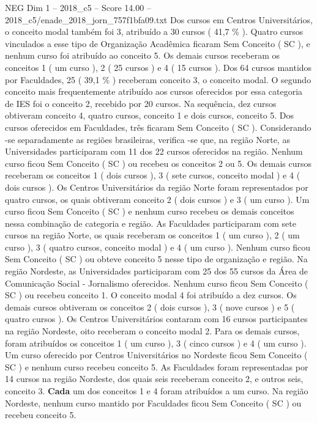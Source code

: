 \begin{textsample}{NEG Dim 1 – 2018\_c5 – Score 14.00 – 2018\_c5/enade\_2018\_jorn\_757f1bfa09.txt}
Dos cursos em Centros Universitários, o conceito modal também foi 3, atribuído a 30 cursos ( 41,7 \% ).
Quatro cursos vinculados a esse tipo de Organização Acadêmica ficaram Sem Conceito ( SC ), e nenhum curso foi atribuído ao conceito 5.
Os demais cursos receberam os conceitos 1 ( um curso ), 2 ( 25 cursos ) e 4 ( 15 cursos ).
Dos 64 cursos mantidos por Faculdades, 25 ( 39,1 \% ) receberam conceito 3, o conceito modal.
O segundo conceito mais frequentemente atribuído aos cursos oferecidos por essa categoria de IES foi o conceito 2, recebido por 20 cursos.
Na sequência, dez cursos obtiveram conceito 4, quatro cursos, conceito 1 e dois cursos, conceito 5.
Dos cursos oferecidos em Faculdades, três ficaram Sem Conceito ( SC ).
Considerando -se separadamente as regiões brasileiras, verifica -se que, na região Norte, as Universidades participaram com 11 dos 22 cursos oferecidos na região.
Nenhum curso ficou Sem Conceito ( SC ) ou recebeu os conceitos 2 ou 5.
Os demais cursos receberam os conceitos 1 ( dois cursos ), 3 ( sete cursos, conceito modal ) e 4 ( dois cursos ).
Os Centros Universitários da região Norte foram representados por quatro cursos, os quais obtiveram conceito 2 ( dois cursos ) e 3 ( um curso ).
Um curso ficou Sem Conceito ( SC ) e nenhum curso recebeu os demais conceitos nessa combinação de categoria e região.
As Faculdades participaram com sete cursos na região Norte, os quais receberam os conceitos 1 ( um curso ), 2 ( um curso ), 3 ( quatro cursos, conceito modal ) e 4 ( um curso ).
Nenhum curso ficou Sem Conceito ( SC ) ou obteve conceito 5 nesse tipo de organização e região.
Na região Nordeste, as Universidades participaram com 25 dos 55 cursos da Área de Comunicação Social - Jornalismo oferecidos.
Nenhum curso ficou Sem Conceito ( SC ) ou recebeu conceito 1.
O conceito modal 4 foi atribuído a dez cursos.
Os demais cursos obtiveram os conceitos 2 ( dois cursos ), 3 ( nove cursos ) e 5 ( quatro cursos ).
Os Centros Universitários contaram com 16 cursos participantes na região Nordeste, oito receberam o conceito modal 2.
Para os demais cursos, foram atribuídos os conceitos 1 ( um curso ), 3 ( cinco cursos ) e 4 ( um curso ).
Um curso oferecido por Centros Universitários no Nordeste ficou Sem Conceito ( SC ) e nenhum curso recebeu conceito 5.
As Faculdades foram representadas por 14 cursos na região Nordeste, dos quais seis receberam conceito 2, e outros seis, conceito 3. \textbf{Cada} um dos conceitos 1 e 4 foram atribuídos a um curso.
Na região Nordeste, nenhum curso mantido por Faculdades ficou Sem Conceito ( SC ) ou recebeu conceito 5.

\end{textsample}
